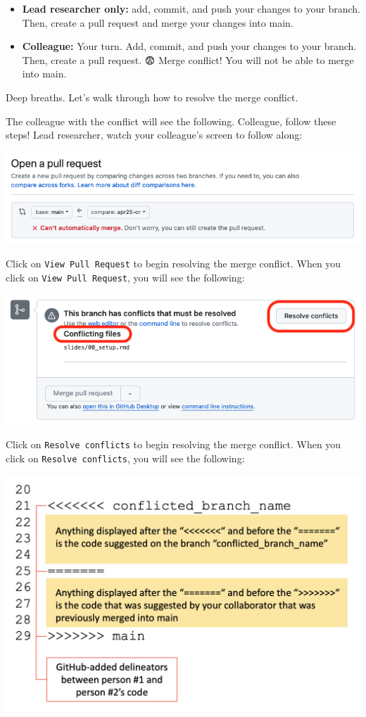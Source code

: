 \documentclass[
]{book}
\providecommand{\tightlist}{%
  \setlength{\itemsep}{0pt}\setlength{\parskip}{0pt}}
\begin{document}
\begin{itemize}
\tightlist
\item
  \textbf{Lead researcher only:} add, commit, and push your changes to your branch.
  Then, create a pull request and merge your changes into main.
\end{itemize}

\begin{itemize}
\tightlist
\item
  \textbf{Colleague:} Your turn. Add, commit, and push your changes to your branch.
  Then, create a pull request. 😨 Merge conflict! You will not
  be able to merge into main.
\end{itemize}

Deep breaths. Let's walk through how to resolve the merge conflict.

The colleague with the conflict will see the following. Colleague, follow these steps!
Lead researcher, watch your colleague's screen to follow along:

\includegraphics[width=1\linewidth]{./figures/merge-conflict-1}

Click on \texttt{View\ Pull\ Request} to begin resolving the merge conflict. When you click on \texttt{View\ Pull\ Request}, you will see the following:

\includegraphics[width=1\linewidth]{./figures/merge-conflict-2}

Click on \texttt{Resolve\ conflicts} to begin resolving the merge conflict. When you click on \texttt{Resolve\ conflicts}, you will see the following:

\includegraphics[width=0.75\linewidth]{./figures/Example-merge-conflict-github}
\end{document}

